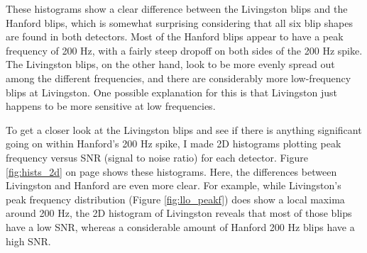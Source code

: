\documentclass[a4paper]{article}
\begin{document}
These histograms show a clear difference between the Livingston blips and the Hanford blips, which is somewhat surprising considering that all six blip shapes are found in both detectors. Most of the Hanford blips appear to have a peak frequency of 200 Hz, with a fairly steep dropoff on both sides of the 200 Hz spike. The Livingston blips, on the other hand, look to be more evenly spread out among the different frequencies, and there are considerably more low-frequency blips at Livingston. One possible explanation for this is that Livingston just happens to be more sensitive at low frequencies. 

To get a closer look at the Livingston blips and see if there is anything significant going on within Hanford's 200 Hz spike, I made 2D histograms plotting peak frequency versus SNR (signal to noise ratio) for each detector. Figure \ref{fig:hists_2d}  on page \pageref{fig:hists_2d} shows these histograms. Here, the differences between Livingston and Hanford are even more clear. For example, while Livingston's peak frequency distribution (Figure \ref{fig:llo_peakf}) does show a local maxima around 200 Hz, the 2D histogram of Livingston reveals that most of those blips have a low SNR, whereas a considerable amount of Hanford 200 Hz blips have a high SNR. 
\end{document}
